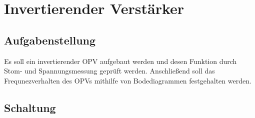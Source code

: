 
\section{Invertierender Verst\"arker}
\subsection{Aufgabenstellung}
Es soll ein invertierender OPV aufgebaut werden und desen Funktion durch Stom- und Spannungsmessung gepr\"uft werden. Anschlie\ss{}end soll das Frequnezverhalten des OPVs mithilfe von Bodediagrammen festgehalten werden.

\subsection{Schaltung}

